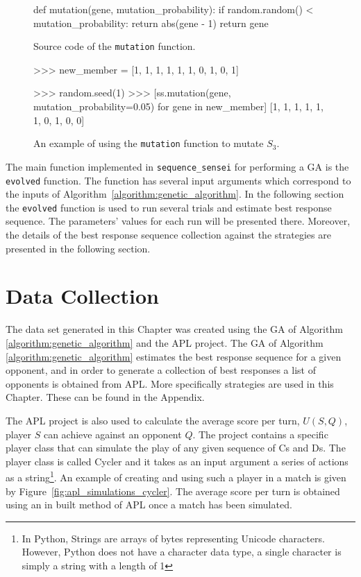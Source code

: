 \begin{figure}[!htbp]
    \begin{sourcepy}
def mutation(gene, mutation_probability):
    if random.random() < mutation_probability:
        return abs(gene - 1)
    return gene
\end{sourcepy}
\caption{Source code of the \texttt{mutation} function.}\label{fig:mutation_implementation}
\end{figure}

\begin{figure}[!htbp]
    \begin{usagepy}
>>> new_member = [1, 1, 1, 1, 1, 1, 0, 1, 0, 1]

>>> random.seed(1)
>>> [ss.mutation(gene, mutation_probability=0.05) for gene in new_member]
[1, 1, 1, 1, 1, 1, 0, 1, 0, 0]

\end{usagepy}
\caption{An example of using the \texttt{mutation} function to mutate
\(S_3\).}\label{fig:mutation_usage}
\end{figure}

The main function implemented in \texttt{sequence_sensei} for
performing a GA is the \texttt{evolved} function. The function has
several input arguments which correspond to the inputs of
Algorithm~\ref{algorithm:genetic_algorithm}. In the following section the
\texttt{evolved} function is used to run several trials and estimate
best response sequence. The parameters' values for each run will be presented there.
Moreover, the details of the best response sequence collection against the
\numberofstrategiesbestsequences strategies are presented in the following section.

\section{Data Collection}\label{section:generating_sequences}

The data set generated in this Chapter was created using the GA of Algorithm
\ref{algorithm:genetic_algorithm} and the APL project. The GA of Algorithm
\ref{algorithm:genetic_algorithm} estimates the best response sequence for a given
opponent, and in order to generate a collection of best responses a list of
opponents is obtained from APL. More specifically \numberofstrategiesbestsequences strategies are used
in this Chapter. These can be found in the Appendix.

The APL project is also used to calculate the average score per turn, \(U(S, Q)\),
player \(S\) can achieve against an opponent \(Q\). The project contains a specific
player
class that can simulate the play of any given sequence of Cs and Ds. The player class
is called Cycler and it takes as an input argument a series of actions as a
string\footnote{In Python, Strings are arrays of bytes representing Unicode
characters. However, Python does not have a character data type, a single
character is simply a string with a length of 1}.
An example of creating and using such a player in a match is given by
Figure~\ref{fig:apl_simulations_cycler}. The average score per turn is obtained
using an in built method of APL once a match has been simulated.

